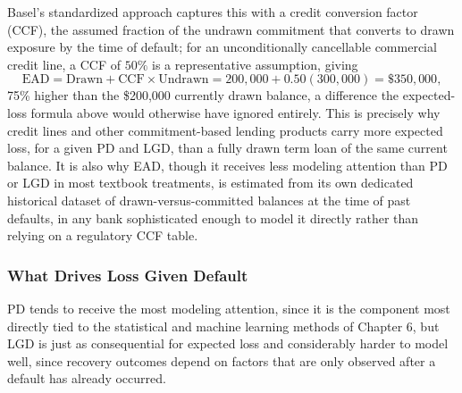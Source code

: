 \documentclass[../ai_in_finance]{subfiles}
\begin{document}
Basel's standardized approach captures this with a credit conversion factor (CCF), the assumed fraction of the undrawn commitment that converts to drawn exposure by the time of default; for an unconditionally cancellable commercial credit line, a CCF of $50\%$ is a representative assumption, giving
\begin{equation*}
\text{EAD} = \text{Drawn} + \text{CCF} \times \text{Undrawn} = 200{,}000 + 0.50(300{,}000) = \$350{,}000,
\end{equation*}
75\% higher than the \$200,000 currently drawn balance, a difference the expected-loss formula above would otherwise have ignored entirely. This is precisely why credit lines and other commitment-based lending products carry more expected loss, for a given PD and LGD, than a fully drawn term loan of the same current balance. It is also why EAD, though it receives less modeling attention than PD or LGD in most textbook treatments, is estimated from its own dedicated historical dataset of drawn-versus-committed balances at the time of past defaults, in any bank sophisticated enough to model it directly rather than relying on a regulatory CCF table.

\subsubsection*{What Drives Loss Given Default}
\label{sec:lgd-drivers}

PD tends to receive the most modeling attention, since it is the component most directly tied to the statistical and machine learning methods of Chapter 6, but LGD is just as consequential for expected loss and considerably harder to model well, since recovery outcomes depend on factors that are only observed after a default has already occurred.
\end{document}
